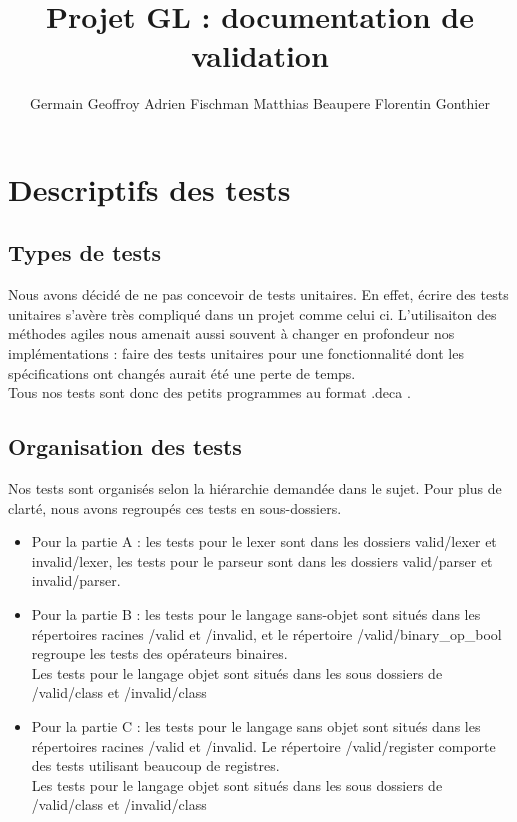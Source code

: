 \documentclass[11pt]{article}
\title{Projet GL : documentation de validation}
\author{Germain Geoffroy Adrien Fischman Matthias Beaupere Florentin Gonthier}
\date{}
\begin{document}
\maketitle

\section{Descriptifs des tests}
\subsection{Types de tests}
Nous avons décidé de ne pas concevoir de tests unitaires. En effet, écrire des tests unitaires s'avère très compliqué dans un projet comme celui ci. L'utilisaiton des méthodes agiles nous amenait aussi souvent à changer en profondeur nos implémentations : faire des tests unitaires pour une fonctionnalité dont les spécifications ont changés aurait été une perte de temps. \\
Tous nos tests sont donc des petits programmes au format .deca .
\subsection{Organisation des tests}
Nos tests sont organisés selon la hiérarchie demandée dans le sujet. Pour plus de clarté, nous avons regroupés ces tests en sous-dossiers. \\
\begin{itemize}
\item Pour la partie A : les tests pour le lexer sont dans les dossiers valid/lexer et invalid/lexer, les tests pour le parseur sont dans les dossiers valid/parser et invalid/parser.
\item Pour la partie B : les tests pour le langage sans-objet sont situés dans les répertoires racines /valid et /invalid, et le répertoire /valid/binary\_op\_bool regroupe les tests des opérateurs binaires.
\\ Les tests pour le langage objet sont situés dans les sous dossiers de /valid/class et /invalid/class
\item Pour la partie C : les tests pour le langage sans objet sont situés dans les répertoires racines /valid et /invalid. Le répertoire /valid/register comporte des tests utilisant beaucoup de registres.
\\ Les tests pour le langage objet sont situés dans les sous dossiers de /valid/class et /invalid/class
\end{itemize}
\end{document}
